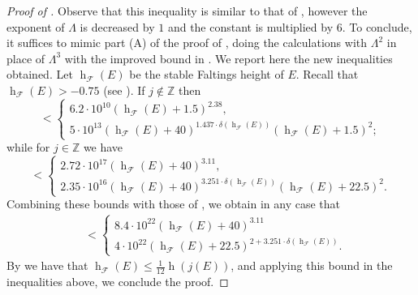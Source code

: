 \documentclass{amsart}
\theoremstyle{definition}
\newcommand{\Z}{\mathbb{Z}}
\newcommand{\GL}{\operatorname{GL}}
\newcommand{\Fheight}{\operatorname{h}_\mathcal{F}}
\numberwithin{theorem}{section}
\numberwithin{equation}{section}
\begin{document}
\begin{proof}[Proof of ]
    Observe that this inequality is similar to that of \cite[Lemma 7.18]{furio24}, however the exponent of $\Lambda$ is decreased by $1$ and the constant is multiplied by $6$.  To conclude, it suffices to mimic part (A) of the proof of \cite[Theorem 7.1]{furio24}, doing the calculations with $\Lambda^2$ in place of $\Lambda^3$ with the improved bound in . 
    We report here the new inequalities obtained. Let $\Fheight(E)$ be the stable Faltings height of $E$. Recall that $\Fheight(E) > -0.75$ (see \cite[Remark 2.4]{furio24}). If $j \notin \Z$ then
    \begin{equation}
    [\GL_2(\widehat{\Z}) : \operatorname{Im}\rho_E] < \begin{cases}
        6.2 \cdot 10^{10} (\Fheight(E)+1.5)^{2.38}, \\
        5 \cdot 10^{13} (\Fheight(E) +40)^{1.437 \cdot \delta(\Fheight(E))} (\Fheight(E) + 1.5)^2;
    \end{cases}
    \end{equation}
    while for $j \in \Z$ we have
    \begin{equation}
        [\GL_2(\widehat{\Z}) : \operatorname{Im}\rho_E] < \begin{cases}
        2.72 \cdot 10^{17} (\Fheight(E) + 40)^{3.11}, \\
        2.35 \cdot 10^{16} (\Fheight(E) +40)^{3.251 \cdot \delta(\Fheight(E))} (\Fheight(E) + 22.5)^2.
    \end{cases}
    \end{equation}
    Combining these bounds with those of , we obtain in any case that
    \begin{align*}
        [\GL_2(\widehat{\Z}) : \operatorname{Im} \rho_E] &< \begin{cases} 8.4 \cdot 10^{22} (\Fheight(E) + 40)^{3.11} \\
		4 \cdot 10^{22} (\Fheight(E) + 22.5)^{2 + 3.251 \cdot \delta(\Fheight(E))}. \end{cases}
    \end{align*}
    By \cite[Theorem 2.3]{furio24} we have that $\Fheight(E) \le \frac{1}{12}\operatorname{h}(j(E))$, and applying this bound in the inequalities above, we conclude the proof.
\end{proof}




\end{document}

